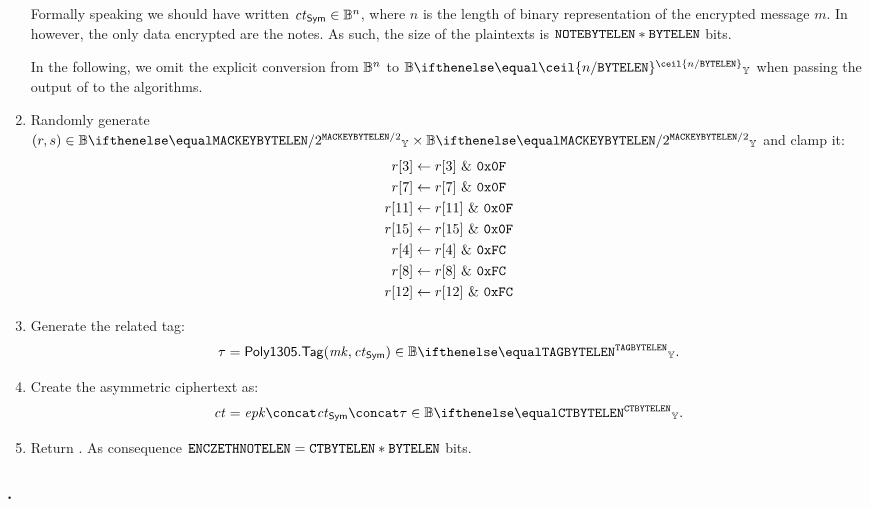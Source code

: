\begin{enumerate}
    \begin{remark}
        Formally speaking we should have written $\mathit{ct}_{\mathsf{Sym}} \in \mathbb{B}^{n}$, where $n$ is the length of binary representation of the encrypted message $m$. In \zeth{} however, the only data encrypted are the notes. As such, the size of the plaintexts is $\mathtt{NOTEBYTELEN} * \mathtt{BYTELEN}$ bits.
    \end{remark}
    \begin{remark}
        In the following, we omit the explicit conversion from $\mathbb{B}^{n}$ to $\BBy{\ceil{n/\byteLen}}$ when passing the output of  to the  algorithms.
    \end{remark}
    \item Randomly generate $(r,s) \in \BBy{\macKeyByteLen/2} \times \BBy{\macKeyByteLen/2}$ and clamp it:
    \begin{align*}
        r[3] &\gets r[3]\ \&\ \texttt{0x0F}\\
        r[7] &\gets r[7]\ \&\ \texttt{0x0F}\\
        r[11] &\gets r[11]\ \&\ \texttt{0x0F}\\
        r[15] &\gets r[15]\ \&\ \texttt{0x0F}\\
        r[4] &\gets r[4]\ \&\ \texttt{0xFC}\\
        r[8] &\gets r[8]\ \&\ \texttt{0xFC}\\
        r[12] &\gets r[12]\ \&\ \texttt{0xFC}
    \end{align*}
    \item Generate the related tag:
    \[
        \tau = \polymac{1305}.\tagg(\mk, \ct_{\sym}) \in \BBy{\tagByteLen}.
    \]
    \item Create the asymmetric ciphertext as:
    \[
        \ct = \epk \concat \ct_{\sym} \concat \tau \in \BBy{\ctByteLen}.
    \]
    \item Return \ct.
    As consequence $\mathtt{ENCZETHNOTELEN}{} = \mathtt{CTBYTELEN}*\mathtt{BYTELEN} $ bits.
\end{enumerate}

\subsubsection{\encscheme.\dec}

